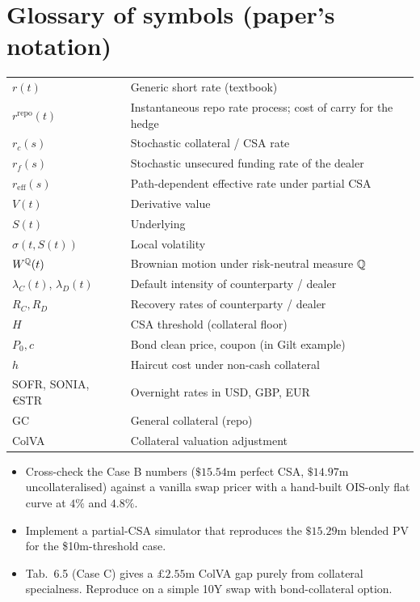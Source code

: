 \documentclass[11pt,a4paper]{article}
\begin{document}
\section{Glossary of symbols (paper's notation)}
\begin{tabular}{@{}p{3cm}p{12cm}@{}}
\toprule
$r(t)$           & Generic short rate (textbook) \\
$r^{\text{repo}}(t)$ & Instantaneous repo rate process; cost of carry for the hedge \\
$r_c(s)$         & Stochastic collateral / CSA rate \\
$r_f(s)$         & Stochastic unsecured funding rate of the dealer \\
$r_{\text{eff}}(s)$ & Path-dependent effective rate under partial CSA \\
$V(t)$           & Derivative value \\
$S(t)$           & Underlying \\
$\sigma(t, S(t))$& Local volatility \\
$W^{\mathbb{Q}}(t)$      & Brownian motion under risk-neutral measure $\mathbb{Q}$ \\
$\lambda_C(t)$, $\lambda_D(t)$ & Default intensity of counterparty / dealer \\
$R_C, R_D$       & Recovery rates of counterparty / dealer \\
$H$              & CSA threshold (collateral floor) \\
$P_0, c$         & Bond clean price, coupon (in Gilt example) \\
$h$              & Haircut cost under non-cash collateral \\
SOFR, SONIA, €STR & Overnight rates in USD, GBP, EUR \\
GC               & General collateral (repo) \\
ColVA            & Collateral valuation adjustment \\
\bottomrule
\end{tabular}

\begin{todobox}
\begin{itemize}[noitemsep]
  \item Cross-check the Case B numbers ($\$15.54$m perfect CSA,
        $\$14.97$m uncollateralised) against a vanilla swap pricer
        with a hand-built OIS-only flat curve at $4\%$ and $4.8\%$.
  \item Implement a partial-CSA simulator that reproduces the
        $\$15.29$m blended PV for the \$10m-threshold case.
  \item Tab.~6.5 (Case C) gives a $\pounds 2.55$m ColVA gap purely
        from collateral specialness. Reproduce on a simple 10Y swap
        with bond-collateral option.
\end{itemize}
\end{todobox}
\end{document}
